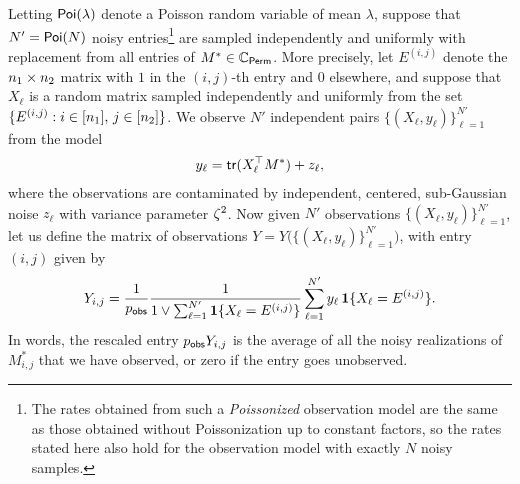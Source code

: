 \documentclass[final,12pt]{colt2018} %
\begin{document}
Letting $\operatorname{\mathsf{Poi}}(\lambda)$ denote a Poisson random variable of mean $\lambda$, suppose that $N' = \operatorname{\mathsf{Poi}}(N)$
noisy entries\footnote{The rates obtained from such a \emph{Poissonized} observation model are the same as those obtained without Poissonization up to constant factors, so the rates stated here also hold for the observation model with exactly $N$ noisy samples.} are sampled independently and uniformly with replacement
from all entries of $M^* \in \mathbb{C}_{\mathsf{Perm}}$.
More precisely, let $E^{(i,j)}$ denote the $n_1 \times n_2$
matrix with $1$ in the $(i,j)$-th entry and $0$ elsewhere, and suppose
that $X_\ell$ is a random matrix sampled independently and uniformly
from the set $\{E^{(i,j)}: i \in [n_1], \, j \in [n_2]\}$. We
observe $N'$ independent pairs $\{(X_\ell,
y_\ell)\}_{\ell=1}^{N'}$ from the model
\begin{align*} %
y_\ell = \trace(X_\ell^\top M^*) + z_\ell,
\end{align*}
where the observations are contaminated by independent, centered,
sub-Gaussian noise $z_\ell$ with variance parameter $\zeta^2$.
%
Now given $N'$ observations $\{(X_\ell, y_\ell)\}_{\ell=1}^{N'}$, let us define the matrix of observations $Y = Y \big( \{(X_\ell, y_\ell)\}_{\ell=1}^{N'} \big)$, with entry $(i, j)$ given by
\begin{align} \label{eq:obs-Y}
Y_{i,j} = \frac{1}{p_{\mathsf{obs}}} \frac{1}{1 \vee \sum_{\ell = 1}^{N'} \mathbf{1} \{ X_\ell = E^{(i,j)} \}} \sum_{\ell = 1}^{N'} y_\ell \, \mathbf{1} \{ X_\ell = E^{(i,j)} \}.
\end{align}
In words, the rescaled entry $p_{\mathsf{obs}} Y_{i,j}$ is the average of all the noisy realizations of $M^*_{i,j}$ that we have observed, or zero if the entry goes unobserved. 
\end{document}
